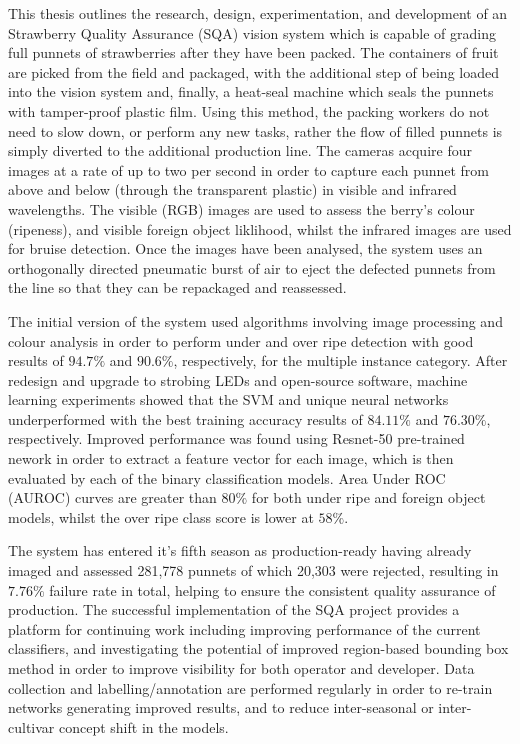 \documentclass[fleqn,twoside,12pt]{report}
\begin{document}
This thesis outlines the research, design, experimentation, and development of an Strawberry Quality Assurance (SQA) vision system which is capable of grading full punnets of strawberries after they have been packed. The containers of fruit are picked from the field and packaged, with the additional step of being loaded into the vision system and, finally, a heat-seal machine which seals the punnets with tamper-proof plastic film. Using this method, the packing workers do not need to slow down, or perform any new tasks, rather the flow of filled punnets is simply diverted to the additional production line. The cameras acquire four images at a rate of up to two per second in order to capture each punnet from above and below (through the transparent plastic) in visible and infrared wavelengths. The visible (RGB) images are used to assess the berry's colour (ripeness), and visible foreign object liklihood, whilst the infrared images are used for bruise detection. Once the images have been analysed, the system uses an orthogonally directed pneumatic burst of air to eject the defected punnets from the line so that they can be repackaged and reassessed. 

The initial version of the system used algorithms involving image processing and colour analysis in order to perform under and over ripe detection with good results of $94.7\%$ and $90.6\%$, respectively, for the multiple instance category. After redesign and upgrade to strobing LEDs and open-source software, machine learning experiments showed that the SVM and unique neural networks underperformed with the best training accuracy results of $84.11\%$ and $76.30\%$, respectively. Improved performance was found using Resnet-50 pre-trained nework in order to extract a feature vector for each image, which is then evaluated by each of the binary classification models. Area Under ROC (AUROC) curves are greater than $80\%$ for both under ripe and foreign object models, whilst the over ripe class score is lower at $58\%$. 

The system has entered it's fifth season as production-ready having already imaged and assessed 281,778 punnets of which 20,303 were rejected, resulting in $7.76\%$ failure rate in total, helping to ensure the consistent quality assurance of production. The successful implementation of the SQA project provides a platform for continuing work including improving performance of the current classifiers, and investigating the potential of improved region-based bounding box method in order to improve visibility for both operator and developer. Data collection and labelling/annotation are performed regularly in order to re-train networks generating improved results, and to reduce inter-seasonal or inter-cultivar concept shift in the models. 
\end{document}
